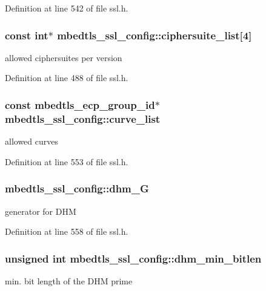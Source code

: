 Definition at line 542 of file ssl.\-h.

\hypertarget{structmbedtls__ssl__config_a15e716727b7dd508dfb96e270f37919f}{
\subsubsection[{ciphersuite\-\_\-list}]{\setlength{\rightskip}{0pt plus 5cm}const int$\ast$ mbedtls\-\_\-ssl\-\_\-config\-::ciphersuite\-\_\-list\mbox{[}4\mbox{]}}}\label{structmbedtls__ssl__config_a15e716727b7dd508dfb96e270f37919f}
allowed ciphersuites per version 

Definition at line 488 of file ssl.\-h.

\hypertarget{structmbedtls__ssl__config_a388e40cfcaadba5c07bf625c7dba18e0}{
\subsubsection[{curve\-\_\-list}]{\setlength{\rightskip}{0pt plus 5cm}const {\bf mbedtls\-\_\-ecp\-\_\-group\-\_\-id}$\ast$ mbedtls\-\_\-ssl\-\_\-config\-::curve\-\_\-list}}\label{structmbedtls__ssl__config_a388e40cfcaadba5c07bf625c7dba18e0}
allowed curves 

Definition at line 553 of file ssl.\-h.

\hypertarget{structmbedtls__ssl__config_af0d45b3fc7171e48a08d904b7383fbba}{
\subsubsection[{dhm\-\_\-\-G}]{ mbedtls\-\_\-ssl\-\_\-config\-::dhm\-\_\-\-G}}\label{structmbedtls__ssl__config_af0d45b3fc7171e48a08d904b7383fbba}
generator for D\-H\-M 

Definition at line 558 of file ssl.\-h.

\hypertarget{structmbedtls__ssl__config_abba2011a713a2afab2cf724c21f11efb}{
\subsubsection[{dhm\-\_\-min\-\_\-bitlen}]{\setlength{\rightskip}{0pt plus 5cm}unsigned int mbedtls\-\_\-ssl\-\_\-config\-::dhm\-\_\-min\-\_\-bitlen}}\label{structmbedtls__ssl__config_abba2011a713a2afab2cf724c21f11efb}
min. bit length of the D\-H\-M prime 

